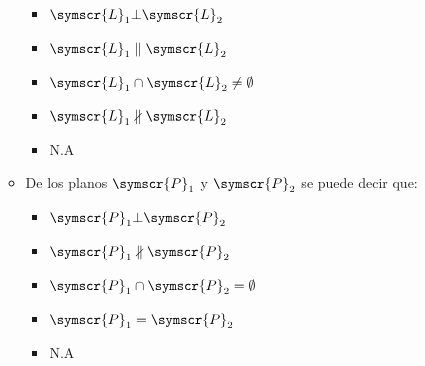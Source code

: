 \documentclass{article}
\def\fancyL{\symscr{L}}
\def\fancyP{\symscr{P}}
\begin{document}
\begin{enumerate}
\begin{itemize}
\begin{itemize}
                \item \(\fancyL_1 \bot \fancyL_2\)
                \item \(\fancyL_1 \parallel \fancyL_2\)
                \item \(\fancyL_1 \cap \fancyL_2 \neq \emptyset\)
                \item \(\fancyL_1 \nparallel \fancyL_2\)
                \item N.A
            \end{itemize}
        \item De los planos \(\fancyP_1\) y \(\fancyP_2\) se puede decir que:
            \begin{itemize}
                \item \(\fancyP_1 \bot \fancyP_2\)
                \item \(\fancyP_1 \nparallel \fancyP_2\)
                \item \(\fancyP_1 \cap \fancyP_2 = \emptyset\)
                \item \(\fancyP_1 = \fancyP_2\)
                \item N.A
            \end{itemize}
    \end{itemize}
\end{enumerate}
\end{document}
